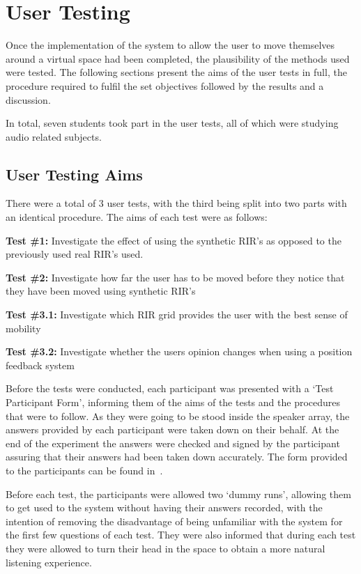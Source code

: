 \documentclass[../../main.tex]{subfiles}
\begin{document}
\section{User Testing}
	Once the implementation of the system to allow the user to move themselves around a virtual space had been completed, the plausibility of the methods used were tested. The following sections present the aims of the user tests in full, the procedure required to fulfil the set objectives followed by the results and a discussion.

	In total, seven students took part in the user tests, all of which were studying audio related subjects.

	\subsection{User Testing Aims}
		There were a total of 3 user tests, with the third being split into two parts with an identical procedure. The aims of each test were as follows:

		\textbf{Test \#1:} Investigate the effect of using the synthetic \ac{RIR}'s as opposed to the previously used real \ac{RIR}'s used.

		\textbf{Test \#2:} Investigate how far the user has to be moved before they notice that they have been moved using synthetic \ac{RIR}'s

		\textbf{Test \#3.1:} Investigate which \ac{RIR} grid provides the user with the best sense of mobility

		\textbf{Test \#3.2:}  Investigate whether the users opinion changes when using a position feedback system

			Before the tests were conducted, each participant was presented with a `Test Participant Form', informing them of the aims of the tests and the procedures that were to follow. As they were going to be stood inside the speaker array, the answers provided by each participant were taken down on their behalf. At the end of the experiment the answers were checked and signed by the participant assuring that their answers had been taken down accurately. The form provided to the participants can be found in~.

			Before each test, the participants were allowed two `dummy runs', allowing them to get used to the system without having their answers recorded, with the intention of removing the disadvantage of being unfamiliar with the system for the first few questions of each test. They were also informed that during each test they were allowed to turn their head in the space to obtain a more natural listening experience.
\end{document}
